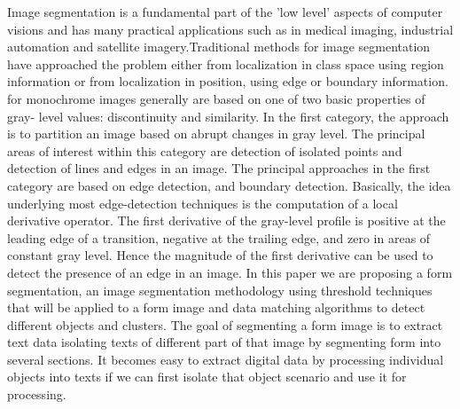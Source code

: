 Image segmentation is a fundamental part of the 'low level' aspects of computer visions and has many practical applications such as in medical imaging, industrial automation and satellite imagery.Traditional methods for image segmentation have approached the problem either from localization in class space using region information or from localization in position, using edge or boundary information. for monochrome images generally are based on one of two basic properties of gray- level values: discontinuity and similarity. In the first category, the approach is to partition an image based on abrupt changes in gray level. The principal areas of interest within this category are detection of isolated points and detection of lines and edges in an image. The principal approaches in the first category are based on edge detection, and boundary detection. Basically, the idea underlying most edge-detection techniques is the computation of a local derivative operator. The first derivative of the gray-level proﬁle is positive at the leading edge of a transition, negative at the trailing edge, and zero in areas of constant gray level. Hence the magnitude of the first derivative can be used to detect the presence of an edge in an image.
In this paper we are proposing a form segmentation, an image segmentation methodology using threshold techniques that will be applied to a form image and data matching algorithms to detect different objects and clusters.
The goal of segmenting a form image is to extract text data isolating texts of different part of that image by segmenting form into several sections. It becomes easy to extract digital data by processing individual objects into texts if we can first isolate that object scenario and use it for processing.

